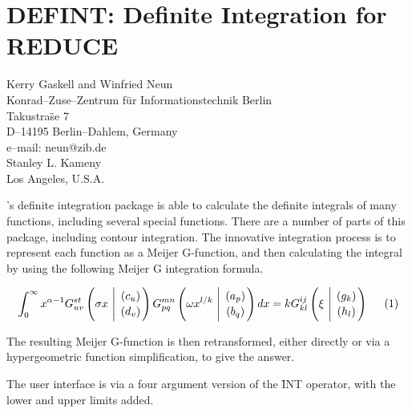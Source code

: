 \chapter{DEFINT: Definite Integration for REDUCE}
\label{DEFINT}

{\footnotesize
\begin{center}
Kerry Gaskell and Winfried Neun \\
Konrad--Zuse--Zentrum f\"ur Informationstechnik Berlin \\
Takustra\"se 7 \\
D--14195 Berlin--Dahlem, Germany \\[0.05in]
e--mail: neun@zib.de \\[0.10in]
Stanley L. Kameny \\
Los Angeles, U.S.A.
\end{center}
}


\REDUCE{}'s definite integration package is able to calculate the
definite integrals of many functions, including several special
functions.  There are a number of parts of this package, including
contour integration.  The innovative integration process is to
represent each function as a Meijer G-function, and then calculating
the integral by using the following Meijer G integration formula.

\begin{displaymath}
\int_{0}^{\infty} x^{\alpha-1} G^{s t}_{u v}
\left( \sigma x \  \Bigg\vert \  {( c_u) \atop (d_v)} \right)
G^{m n}_{p q} \left( \omega x^{l/k} \  \Bigg\vert \ {(a_p) \atop (b_q)}
\right) dx = k G^{i j}_{k l} \left( \xi \ \Bigg\vert \
{(g_k) \atop (h_l)} \right)  \hspace{5mm} (1)
\end{displaymath}

The resulting Meijer G-function is then retransformed, either directly
or via a hypergeometric function simplification, to give
the answer.

The user interface is via a four argument version of the
\f{INT} operator, with the lower and upper limits added.

